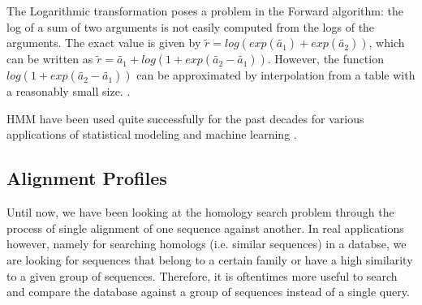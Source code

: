 \label{log-transform}
The Logarithmic transformation poses a problem in the Forward algorithm: the log of a sum of two arguments is not easily computed from the logs of the arguments. The exact value is given by  $ \tilde{r} = log (exp(\tilde{a_1}) + exp(\tilde{a_2})) $, which can be written as $ \tilde{ r } = \tilde{a_1} + log (1 + exp(\tilde{a_2} - \tilde{a_1}))$. However, the function $log (1 + exp(\tilde{a_2} - \tilde{a_1}))$ can be approximated by interpolation from a table with a reasonably small size. \cite{hmmsbook}.

HMM have been used quite successfully for the past decades for various applications of statistical modeling and machine learning \cite{hmms-speech}.




\subsection{Alignment Profiles}

Until now, we have been looking at the homology search problem through the process of single alignment of one sequence against another.
In real applications however, namely for searching homologs (i.e. similar sequences) in a databse, we are looking for sequences that belong to a certain family or have a high similarity to a given group of sequences. Therefore, it is oftentimes more useful to search and compare the database against a group of sequences instead of a single query.


